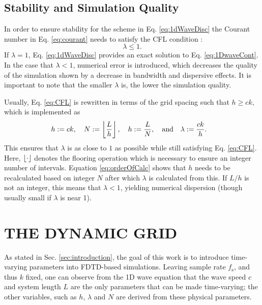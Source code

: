 \documentclass[fleqn]{jaes}
\begin{document}
\subsection{Stability and Simulation Quality}\label{sec:quality}
In order to ensure stability for the scheme in Eq. \eqref{eq:1dWaveDisc} the Courant number in Eq. \eqref{eq:courant} needs to satisfy the CFL condition \cite{Courant1928}:
\begin{equation}\label{eq:CFL}
    \lambda \leq 1.
\end{equation}
%
If $\lambda = 1$, Eq. \eqref{eq:1dWaveDisc} provides an exact solution to Eq. \eqref{eq:1DwaveCont}. In the case that $\lambda < 1$, numerical error is introduced, which decreases the quality of the simulation shown by a decrease in bandwidth and dispersive effects. It is important to note that the smaller $\lambda$ is, the lower the simulation quality.

Usually, Eq. \eqref{eq:CFL} is rewritten in terms of the grid spacing such that $h \geq c k$,
which is implemented as
\begin{equation}\label{eq:orderOfCalc}
    \!\!\!\!\!h:=ck, \quad N := \floor[\frac{L}{h}],\quad h := \frac{L}{N},\qaq \lambda := \frac{ck}{h}.
\end{equation}
This ensures that $\lambda$ is as close to $1$ as possible while still satisfying Eq. \eqref{eq:CFL}. Here, $\floor[\cdot]$ denotes the flooring operation which is necessary to ensure an integer number of intervals. Equation \eqref{eq:orderOfCalc} shows that $h$ needs to be recalculated based on integer $N$ after which $\lambda$ is calculated from this. If $L/h$ is not an integer, this means that $\lambda < 1$, yielding numerical dispersion (though usually small if $\lambda$ is near 1).

\section{THE DYNAMIC GRID}\label{sec:dynamicGrid}
As stated in Sec. \ref{sec:introduction}, the goal of this work is to introduce time-varying parameters into FDTD-based simulations. 
Leaving sample rate $f_\text{s}$, and thus $k$ fixed, one can observe from the 1D wave equation that the wave speed $c$ and system length $L$ are the only parameters that can be made time-varying; the other variables, such as $h$, $\lambda$ and $N$ are derived from these physical parameters. 
\end{document}
